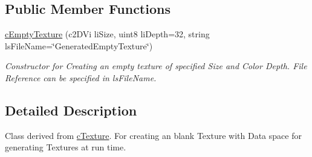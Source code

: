 \subsection*{Public Member Functions}
\begin{DoxyCompactItemize}
\item 
\hypertarget{classc_empty_texture_a485c0988383cf2bee2af9855146116aa}{
\hyperlink{classc_empty_texture_a485c0988383cf2bee2af9855146116aa}{cEmptyTexture} (c2DVi liSize, uint8 liDepth=32, string lsFileName=\char`\"{}GeneratedEmptyTexture\char`\"{})}
\label{classc_empty_texture_a485c0988383cf2bee2af9855146116aa}

\begin{DoxyCompactList}\small\item\em Constructor for Creating an empty texture of specified Size and Color Depth. File Reference can be specified in lsFileName. \end{DoxyCompactList}\end{DoxyCompactItemize}


\subsection{Detailed Description}
Class derived from \hyperlink{classc_texture}{cTexture}. For creating an blank Texture with Data space for generating Textures at run time. 